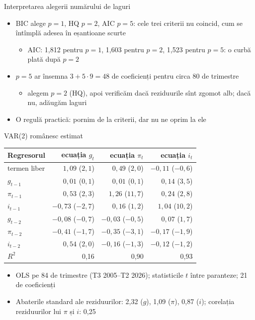 \begin{frame}{Interpretarea alegerii numărului de laguri}
\itemsize{\small}
\begin{itemize}
    \item BIC alege $p = 1$, HQ $p = 2$, AIC $p = 5$: cele trei criterii nu coincid, cum se întîmplă adesea în eșantioane scurte
    \begin{itemize}
        \item AIC: 1{,}812 pentru $p = 1$, 1{,}603 pentru $p = 2$, 1{,}523 pentru $p = 5$: o curbă plată după $p = 2$
    \end{itemize}
    \item $p = 5$ ar însemna $3 + 5 \cdot 9 = 48$ de coeficienți pentru circa 80 de trimestre
    \begin{itemize}
        \item alegem $p = 2$ (HQ), apoi verificăm dacă reziduurile sînt zgomot alb; dacă nu, adăugăm laguri
    \end{itemize}
    \item O regulă practică: pornim de la criterii, dar nu ne oprim la ele
\end{itemize}
\end{frame}

\begin{frame}{VAR(2) românesc estimat}
\itemsize{\small}
\begin{center}
\scriptsize
\begin{tabular}{lrrr}
\toprule
\textbf{Regresorul} & \textbf{ecuația $g_t$} & \textbf{ecuația $\pi_t$} & \textbf{ecuația $i_t$} \\
\midrule
termen liber & $1{,}09$ ($2{,}1$) & $0{,}49$ ($2{,}0$) & $-0{,}11$ ($-0{,}6$) \\
$g_{t-1}$ & $0{,}01$ ($0{,}1$) & $0{,}01$ ($0{,}1$) & $0{,}14$ ($3{,}5$) \\
$\pi_{t-1}$ & $0{,}53$ ($2{,}3$) & $1{,}26$ ($11{,}7$) & $0{,}24$ ($2{,}8$) \\
$i_{t-1}$ & $-0{,}73$ ($-2{,}7$) & $0{,}16$ ($1{,}2$) & $1{,}04$ ($10{,}2$) \\
$g_{t-2}$ & $-0{,}08$ ($-0{,}7$) & $-0{,}03$ ($-0{,}5$) & $0{,}07$ ($1{,}7$) \\
$\pi_{t-2}$ & $-0{,}41$ ($-1{,}7$) & $-0{,}35$ ($-3{,}1$) & $-0{,}17$ ($-1{,}9$) \\
$i_{t-2}$ & $0{,}54$ ($2{,}0$) & $-0{,}16$ ($-1{,}3$) & $-0{,}12$ ($-1{,}2$) \\
$R^2$ & 0{,}16 & 0{,}90 & 0{,}93 \\
\bottomrule
\end{tabular}
\end{center}
\begin{itemize}
    \item OLS pe 84 de trimestre (T3 2005--T2 2026); statisticile $t$ între paranteze; 21 de coeficienți
    \item Abaterile standard ale reziduurilor: 2{,}32 ($g$), 1{,}09 ($\pi$), 0{,}87 ($i$); corelația reziduurilor lui $\pi$ și $i$: 0{,}25
\end{itemize}
\end{frame}

